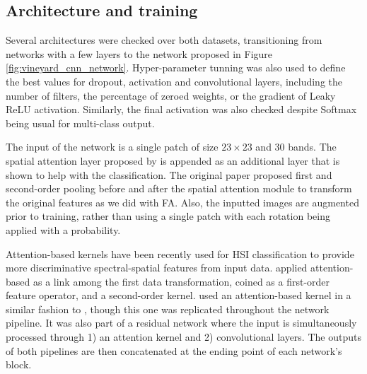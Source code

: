 \subsection{Architecture and training}

Several architectures were checked over both datasets, transitioning from networks with a few layers to the network proposed in Figure \ref{fig:vineyard_cnn_network}. Hyper-parameter tunning was also used to define the best values for dropout, activation and convolutional layers, including the number of filters, the percentage of zeroed weights, or the gradient of Leaky ReLU activation. Similarly, the final activation was also checked despite Softmax being usual for multi-class output. 

The input of the network is a single patch of size $23 \times 23$ and 30 bands. The spatial attention layer proposed by \cite{xue_attention-based_2021} is appended as an additional layer that is shown to help with the classification. The original paper proposed first and second-order pooling before and after the spatial attention module to transform the original features as we did with FA. Also, the inputted images are augmented prior to training, rather than using a single patch with each rotation being applied with a probability.

Attention-based kernels have been recently used for HSI classification to provide more discriminative spectral-spatial features from input data. \cite{xue_attention-based_2021} applied attention-based as a link among the first data transformation, coined as a first-order feature operator, and a second-order kernel. \cite{roy_attention-based_2021} used an attention-based kernel in a similar fashion to \cite{xue_attention-based_2021}, though this one was replicated throughout the network pipeline. It was also part of a residual network where the input is simultaneously processed through 1) an attention kernel and 2) convolutional layers. The outputs of both pipelines are then concatenated at the ending point of each network's block. 

